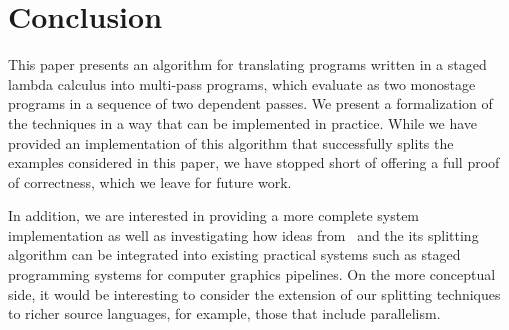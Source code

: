 \section{Conclusion}

This paper presents an algorithm for translating programs written in a
staged lambda calculus into multi-pass programs, which evaluate as two
monostage programs in a sequence of two dependent passes. We present a
formalization of the techniques in a way that can be implemented in
practice.  While we have provided an implementation of this algorithm
that successfully splits the examples considered in this paper, we
have stopped short of offering a full proof of correctness, which we
leave for future work.

In addition, we are interested in providing a more complete system
implementation as well as investigating how ideas from \lang\ and the
its splitting algorithm can be integrated into existing practical
systems such as staged programming systems for computer graphics
pipelines.  On the more conceptual side, it would be interesting to
consider the extension of our splitting techniques to richer source
languages, for example, those that include parallelism.


